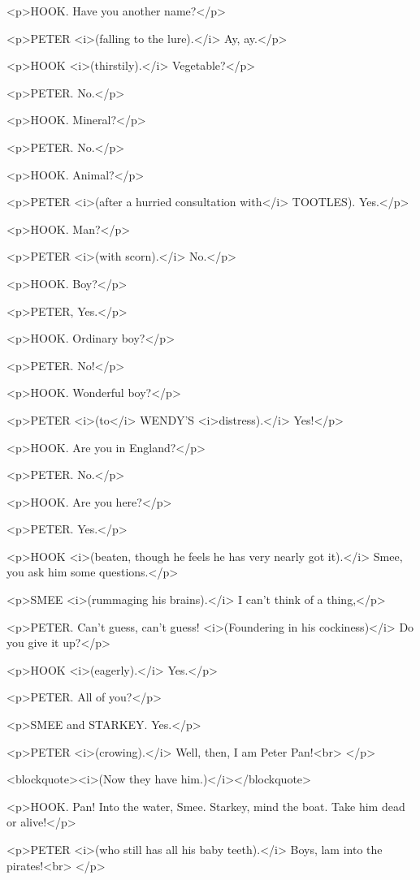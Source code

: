 <p>HOOK. Have you another name?</p>

<p>PETER <i>(falling to the lure).</i> Ay, ay.</p>

<p>HOOK <i>(thirstily).</i> Vegetable?</p>

<p>PETER. No.</p>

<p>HOOK. Mineral?</p>

<p>PETER. No.</p>

<p>HOOK. Animal?</p>

<p>PETER <i>(after a hurried consultation with</i> TOOTLES). Yes.</p>

<p>HOOK. Man?</p>

<p>PETER <i>(with scorn).</i> No.</p>

<p>HOOK. Boy?</p>

<p>PETER, Yes.</p>

<p>HOOK. Ordinary boy?</p>

<p>PETER. No!</p>

<p>HOOK. Wonderful boy?</p>

<p>PETER <i>(to</i> WENDY'S <i>distress).</i> Yes!</p>

<p>HOOK. Are you in England?</p>

<p>PETER. No.</p>

<p>HOOK. Are you here?</p>

<p>PETER. Yes.</p>

<p>HOOK <i>(beaten, though he feels he has very nearly got it).</i>
Smee, you ask him some questions.</p>

<p>SMEE <i>(rummaging his brains).</i> I can't think of a thing,</p>

<p>PETER. Can't guess, can't guess! <i>(Foundering in his
cockiness)</i> Do you give it up?</p>

<p>HOOK <i>(eagerly).</i> Yes.</p>

<p>PETER. All of you?</p>

<p>SMEE and STARKEY. Yes.</p>

<p>PETER <i>(crowing).</i> Well, then, I am Peter Pan!<br>
</p>

<blockquote><i>(Now they have him.)</i></blockquote>

<p>HOOK. Pan! Into the water, Smee. Starkey, mind the boat. Take him
dead or alive!</p>

<p>PETER <i>(who still has all his baby teeth).</i> Boys, lam into
the pirates!<br>
</p>

